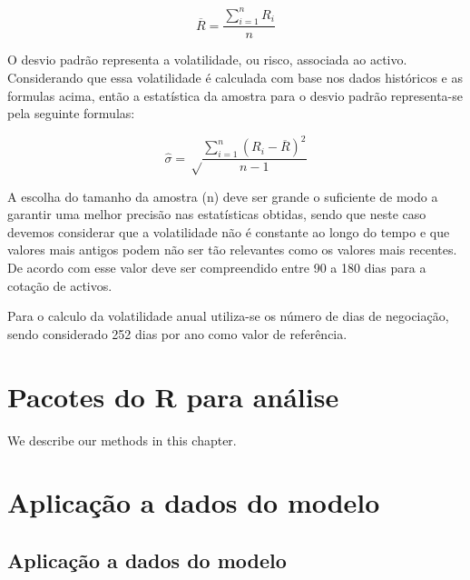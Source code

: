 \documentclass[
  12pt,
  a4paper,
  openany]{book}
\begin{document}
\begin{equation} 
  \overline{R} = \frac{\displaystyle\sum_{i=1}^n R_i}{n}
  \label{eq:meanRet}
\end{equation}

O desvio padrão representa a volatilidade, ou risco, associada ao activo. Considerando que essa volatilidade é calculada com base nos dados históricos e as formulas acima, então a estatística da amostra para o desvio padrão representa-se pela seguinte formulas:

\begin{equation} 
  \hat{\sigma} = \sqrt\frac{\displaystyle\sum_{i=1}^n (R_i-\overline{R})^2}{n-1}
  \label{eq:estdesviopadrao}
\end{equation}

A escolha do tamanho da amostra (n) deve ser grande o suficiente de modo a garantir uma melhor precisão nas estatísticas obtidas, sendo que neste caso devemos considerar que a volatilidade não é constante ao longo do tempo e que valores mais antigos podem não ser tão relevantes como os valores mais recentes. De acordo com \citep{Hull2018} esse valor deve ser compreendido entre 90 a 180 dias para a cotação de activos.

Para o calculo da volatilidade anual utiliza-se os número de dias de negociação, sendo considerado 252 dias por ano como valor de referência.

\hypertarget{pacotes-do-r-para-anuxe1lise}{%
\chapter{Pacotes do R para análise}\label{pacotes-do-r-para-anuxe1lise}}

\newpage

We describe our methods in this chapter.

\hypertarget{aplicauxe7uxe3o-a-dados-do-modelo}{%
\chapter{Aplicação a dados do modelo}\label{aplicauxe7uxe3o-a-dados-do-modelo}}

\endgroup
\newpage

\hypertarget{aplicauxe7uxe3o-a-dados-do-modelo-1}{%
\section{Aplicação a dados do modelo}\label{aplicauxe7uxe3o-a-dados-do-modelo-1}}
\end{document}
